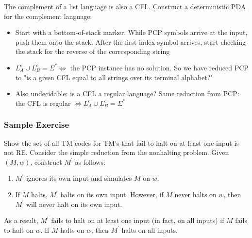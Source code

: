 The complement of a list language is also a CFL. Construct a deterministic PDA for the complement language:
\begin{itemize}
    \item Start with a bottom-of-stack marker. While PCP symbols arrive at the input, push them onto the stack. After the first index symbol arrives, start checking the stack for the reverse of the corresponding string
    \item $L_A^c \cup L_B^c = \Sigma^* \iff$ the PCP instance has no solution. So we have reduced PCP to "is a given CFL equal to all strings over its terminal alphabet?"
    \item Also undecidable: is a CFL a regular language? Same reduction from PCP: the CFL is regular $\iff L_A^c \cup L_B^c = \Sigma^*$
\end{itemize}
\subsubsection{Sample Exercise}
Show the set of all TM codes for TM's that fail to halt on at least one input is not RE.
Consider the simple reduction from the nonhalting problem. Given $(M,w)$, construct $M^\prime$ as follows:
\begin{enumerate}
    \item $M^\prime$ ignores its own input and simulates $M$ on $w$.
    \item If $M$ halts, $M^\prime$ halts on its own input. However, if $M$ never halts on $w$, then $M^\prime$ will never halt on its own input.
\end{enumerate}
As a result, $M^\prime$ fails to halt on at least one input (in fact, on all inputs) if $M$ fails to halt on $w$. If $M$ halts on $w$, then $M^\prime$ halts on all inputs.

